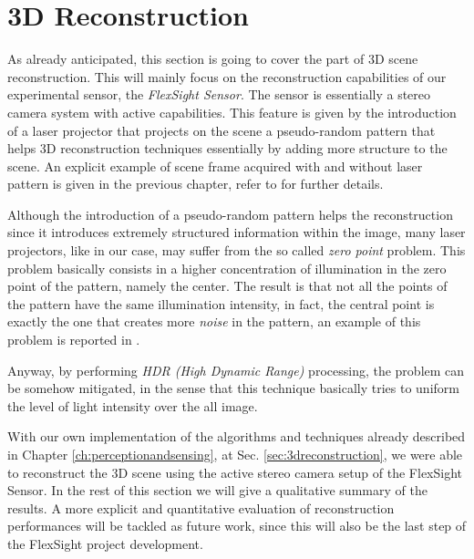 \section{3D Reconstruction}\label{sec:exp_3d_reconstruction}
As already anticipated, this section is going to cover the part of 3D scene reconstruction. This will mainly focus on the reconstruction capabilities of our experimental sensor, the \emph{FlexSight Sensor}. The sensor is essentially a stereo camera system with active capabilities. This feature is given by the introduction of a laser projector that projects on the scene a pseudo-random pattern that helps 3D reconstruction techniques essentially by adding more structure to the scene. An explicit example of scene frame acquired with and without laser pattern is given in the previous chapter, refer to  for further details.

Although the introduction of a pseudo-random pattern helps the reconstruction since it introduces extremely structured information within the image, many laser projectors, like in our case, may suffer from the so called \emph{zero point} problem. This problem basically consists in a higher concentration of illumination in the zero point of the pattern, namely the center. The result is that not all the points of the pattern have the same illumination intensity, in fact, the central point is exactly the one that creates more \emph{noise} in the pattern, an example of this problem is reported in .

Anyway, by performing \emph{HDR (High Dynamic Range)} processing, the problem can be somehow mitigated, in the sense that this technique basically tries to uniform the level of light intensity over the all image.

With our own implementation of the algorithms and techniques already described in Chapter \ref{ch:perceptionandsensing}, at Sec. \ref{sec:3dreconstruction}, we were able to reconstruct the 3D scene using the active stereo camera setup of the FlexSight Sensor. In the rest of this section we will give a qualitative summary of the results. A more explicit and quantitative evaluation of reconstruction performances will be tackled as future work, since this will also be the last step of the FlexSight project development.

